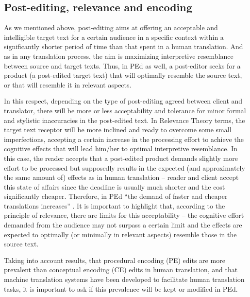 \documentclass[output=paper]{langsci/langscibook}
\begin{document}
\subsection{Post-editing, relevance and encoding\label{alves:sec:PosteditingRelevanceAndEncoding}}

As we mentioned above, post-editing aims at offering an acceptable and intelligible target text for a certain audience in a specific context within a significantly shorter period of time than that spent in a human translation. And as in any translation process, the aim is maximizing interpretive resemblance between source and target texts. Thus, in PEd as well, a post-editor seeks for a product (a post-edited target text) that will optimally resemble the source text, or that will resemble it in relevant aspects. 


In this respect, depending on the type of post-editing agreed between client and translator, there will be more or less acceptability and tolerance for minor formal and stylistic inaccuracies in the post-edited text. In Relevance Theory terms, the target text receptor will be more inclined and ready to overcome some small imperfections, accepting a certain increase in the processing effort to achieve the cognitive effects that will lead him/her to optimal interpretive resemblance. In this case, the reader accepts that a post-edited product demands slightly more effort to be processed but supposedly results in the expected (and approximately the same amount of) effects as in human translation -- reader and client accept this state of affairs since the deadline is usually much shorter and the cost significantly cheaper. Therefore, in PEd ``the demand of faster and cheaper translations increases'' \citep[171]{aziz2014}. It is important to highlight that, according to the principle of relevance, there are limits for this acceptability -- the cognitive effort demanded from the audience may not surpass a certain limit and the effects are expected to optimally (or minimally in relevant aspects) resemble those in the source text.



Taking into account \citet{alves2013} results, that procedural encoding (PE) edits are more prevalent than conceptual encoding (CE) edits in human translation, and that machine translation systems have been developed to facilitate human translation tasks, it is important to ask if this prevalence will be kept or modified in PEd.
\end{document}
